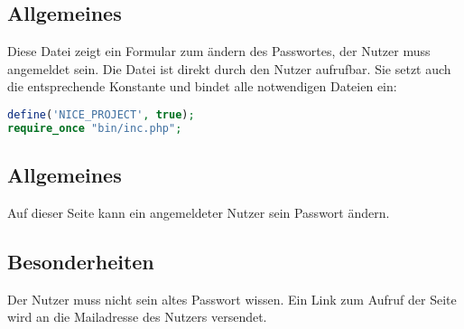 \subsection{Allgemeines} Diese Datei zeigt ein Formular zum ändern des Passwortes, der Nutzer muss angemeldet sein.
Die Datei ist direkt durch den Nutzer aufrufbar. Sie setzt auch die entsprechende Konstante und bindet alle notwendigen Dateien ein:
\begin{lstlisting}[language=php]
define('NICE_PROJECT', true);
require_once "bin/inc.php";
\end{lstlisting}
\subsection{Allgemeines}
Auf dieser Seite kann ein angemeldeter Nutzer sein Passwort ändern.
\subsection{Besonderheiten}
Der Nutzer muss nicht sein altes Passwort wissen. Ein Link zum Aufruf der Seite wird an die Mailadresse des Nutzers versendet.